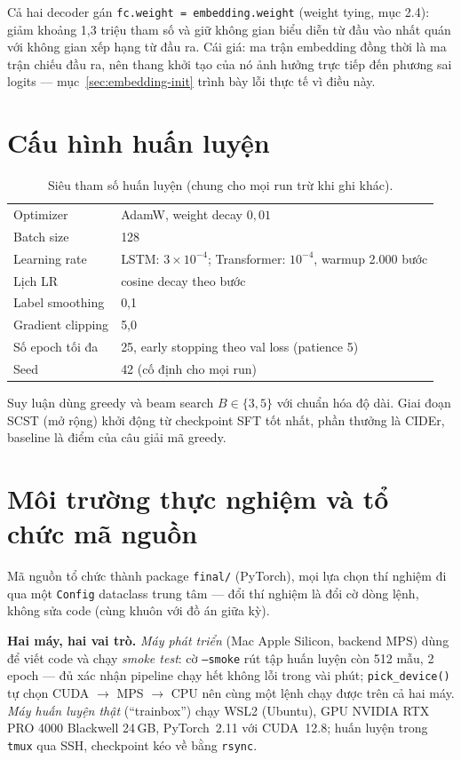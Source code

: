 Cả hai decoder gán \texttt{fc.weight = embedding.weight} (weight tying, mục
2.4): giảm khoảng 1,3 triệu tham số và giữ không gian biểu diễn từ đầu vào nhất
quán với không gian xếp hạng từ đầu ra. Cái giá: ma trận embedding đồng thời là
ma trận chiếu đầu ra, nên thang khởi tạo của nó ảnh hưởng trực tiếp đến phương
sai logits --- mục~\ref{sec:embedding-init} trình bày lỗi thực tế vì điều này.

\section{Cấu hình huấn luyện}

\begin{table}[H]
	\centering
	\caption{Siêu tham số huấn luyện (chung cho mọi run trừ khi ghi khác).}
	\label{tab:hyperparams}
	\begin{tabular}{ll}
		\hline
		Optimizer & AdamW, weight decay $0{,}01$ \\
		Batch size & 128 \\
		Learning rate & LSTM: $3\times10^{-4}$; Transformer: $10^{-4}$, warmup 2.000 bước \\
		Lịch LR & cosine decay theo bước \\
		Label smoothing & 0,1 \\
		Gradient clipping & 5,0 \\
		Số epoch tối đa & 25, early stopping theo val loss (patience 5) \\
		Seed & 42 (cố định cho mọi run) \\
		\hline
	\end{tabular}
\end{table}

Suy luận dùng greedy và beam search $B \in \{3, 5\}$ với chuẩn hóa độ dài.
Giai đoạn SCST (mở rộng) khởi động từ checkpoint SFT tốt nhất, phần thưởng là
CIDEr, baseline là điểm của câu giải mã greedy.

\section{Môi trường thực nghiệm và tổ chức mã nguồn}

Mã nguồn tổ chức thành package \texttt{final/} (PyTorch), mọi lựa chọn thí nghiệm
đi qua một \texttt{Config} dataclass trung tâm --- đổi thí nghiệm là đổi cờ dòng
lệnh, không sửa code (cùng khuôn với đồ án giữa kỳ).

\textbf{Hai máy, hai vai trò.} \emph{Máy phát triển} (Mac Apple Silicon,
backend MPS) dùng để viết code và chạy \emph{smoke test}: cờ \texttt{--smoke}
rút tập huấn luyện còn 512 mẫu, 2 epoch --- đủ xác nhận pipeline chạy hết
không lỗi trong vài phút; \texttt{pick\_device()} tự chọn CUDA $\to$ MPS $\to$
CPU nên cùng một lệnh chạy được trên cả hai máy. \emph{Máy huấn luyện thật}
(``trainbox'') chạy WSL2 (Ubuntu), GPU NVIDIA RTX PRO 4000 Blackwell 24\,GB,
PyTorch~2.11 với CUDA~12.8; huấn luyện trong \texttt{tmux} qua SSH, checkpoint
kéo về bằng \texttt{rsync}.

